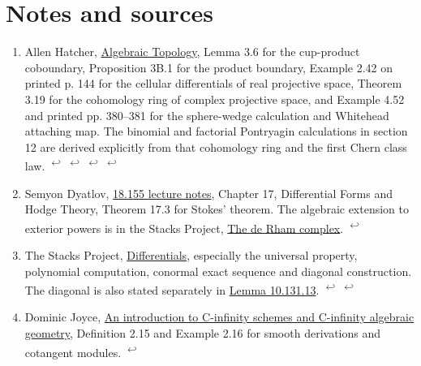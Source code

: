 \documentclass[11pt,letterpaper]{article}
\begin{document}
\clearpage\section*{Notes and sources}\hypertarget{notes-and-sources}{}

\begingroup\small
\begin{enumerate}[leftmargin=1.8em,label=\arabic*.,itemsep=.8em]
\item \hypertarget{note-hatcher}{}Allen Hatcher, \href{https://pi.math.cornell.edu/~hatcher/AT/AT.pdf}{Algebraic Topology}, Lemma 3.6 for the cup-product coboundary, Proposition 3B.1 for the product boundary, Example 2.42 on printed p. 144 for the cellular differentials of real projective space, Theorem 3.19 for the cohomology ring of complex projective space, and Example 4.52 and printed pp. 380–381 for the sphere-wedge calculation and Whitehead attaching map. The binomial and factorial Pontryagin calculations in section 12 are derived explicitly from that cohomology ring and the first Chern class law. \hyperlink{citation-hatcher-1}{\textsuperscript{\(\hookleftarrow\)}} \hyperlink{citation-hatcher-2}{\textsuperscript{\(\hookleftarrow\)}} \hyperlink{citation-hatcher-3}{\textsuperscript{\(\hookleftarrow\)}} \hyperlink{citation-hatcher-4}{\textsuperscript{\(\hookleftarrow\)}}
\item \hypertarget{note-stokes}{}Semyon Dyatlov, \href{https://math.mit.edu/~dyatlov/18.155/155-notes.pdf}{18.155 lecture notes}, Chapter 17, Differential Forms and Hodge Theory, Theorem 17.3 for Stokes' theorem. The algebraic extension to exterior powers is in the Stacks Project, \href{https://stacks.math.columbia.edu/tag/0FKF}{The de Rham complex}. \hyperlink{citation-stokes-1}{\textsuperscript{\(\hookleftarrow\)}}
\item \hypertarget{note-stacks-diff}{}The Stacks Project, \href{https://stacks.math.columbia.edu/tag/00RM}{Differentials}, especially the universal property, polynomial computation, conormal exact sequence and diagonal construction. The diagonal is also stated separately in \href{https://stacks.math.columbia.edu/tag/00RW}{Lemma 10.131.13}. \hyperlink{citation-stacks-diff-1}{\textsuperscript{\(\hookleftarrow\)}} \hyperlink{citation-stacks-diff-2}{\textsuperscript{\(\hookleftarrow\)}}
\item \hypertarget{note-joyce}{}Dominic Joyce, \href{https://arxiv.org/pdf/1104.4951}{An introduction to C-infinity schemes and C-infinity algebraic geometry}, Definition 2.15 and Example 2.16 for smooth derivations and cotangent modules. \hyperlink{citation-joyce-1}{\textsuperscript{\(\hookleftarrow\)}}

\end{enumerate}
\end{document}
